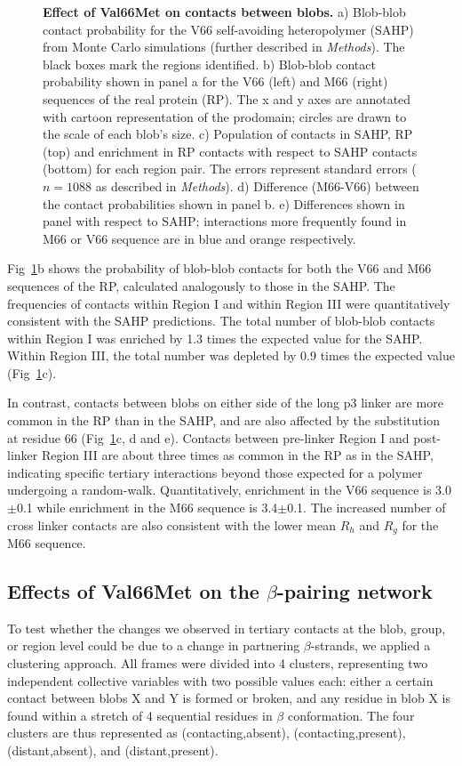 \documentclass[10pt,letterpaper]{article}
\begin{document}
\begin{figure}[!ht]
\caption{{\bf Effect of Val66Met on contacts between blobs.} a) Blob-blob contact probability for the V66 self-avoiding heteropolymer (SAHP) from Monte Carlo simulations (further described in {\it Methods}). The black boxes mark the regions identified. b) Blob-blob contact probability shown in panel a for the V66 (left) and M66 (right) sequences of the real protein (RP). The x and y axes are annotated with cartoon representation of the prodomain; circles are drawn to the scale of each blob's size. c) Population of contacts in SAHP, RP (top) and enrichment in RP contacts with respect to SAHP contacts (bottom) for each region pair. The errors represent standard errors ($n =1088$ as described in {\it Methods}). d) Difference (M66-V66) between the contact probabilities shown in panel b. e) Differences shown in panel with respect to SAHP; interactions more frequently found in M66 or V66 sequence are in blue and orange respectively.}
\label{fig5}
\end{figure}


Fig~\ref{fig5}b shows the probability of blob-blob contacts for both the V66 and M66 sequences of the RP, calculated analogously to those in the SAHP. The frequencies of contacts within Region I and within Region III were quantitatively consistent with the SAHP predictions. The total number of blob-blob contacts within Region I was enriched by 1.3 times the expected value for the SAHP. Within Region III, the total number was depleted by 0.9 times the expected value (Fig~\ref{fig5}c).

In contrast, contacts between blobs on either side of the long p3 linker are more common in the RP than in the SAHP, and are also affected by the substitution at residue 66 (Fig~\ref{fig5}c, d and e). Contacts between pre-linker Region I and post-linker Region III are about three times as common in the RP as in the SAHP, indicating specific tertiary interactions beyond those expected for a polymer undergoing a random-walk. Quantitatively, enrichment in the V66 sequence is 3.0$\pm$0.1 while enrichment in the M66 sequence is 3.4$\pm$0.1. The increased number of cross linker contacts are also consistent with the lower mean $R_h$ and $R_g$ for the M66 sequence.

\subsection*{Effects of Val66Met on the $\beta$-pairing network} 
\label{sec:betacoupling}

To test whether the changes we observed in tertiary contacts at the blob, group, or region level could be due to a change in partnering $\beta$-strands, we applied a clustering approach. All frames were divided into 4 clusters, representing two independent collective variables with two possible values each: either a certain contact between blobs X and Y is formed or broken, and any residue in blob X is found within a stretch of 4 sequential residues in $\beta$ conformation. The four clusters are thus represented as (contacting,absent), (contacting,present), (distant,absent), and (distant,present).
\end{document}
